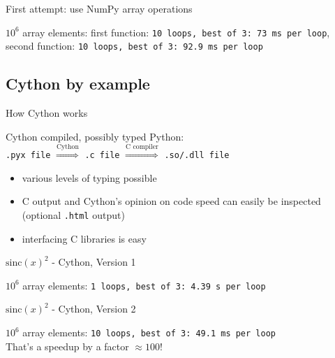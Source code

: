 \begin{frame}{First attempt: use NumPy array operations}



\pause
$10^{6}$ array elements: first function: {\texttt{10 loops, best of 3: 73 ms per loop}},
second function: {\texttt{10 loops, best of 3: 92.9 ms per loop}}

\end{frame}


\subsection{Cython by example}

\begin{frame}{How Cython works}

\begin{exbox}{Cython}
compiled, possibly typed Python:\\[1ex]
{\texttt{.pyx file}} $\stackrel{\text{Cython}}{\Longrightarrow}$ {\texttt{.c file}} $\stackrel{\text{C compiler}}{\Longrightarrow}$ {\texttt{.so/.dll file}}
\end{exbox}

\begin{itemize}
    \item various levels of typing possible
    \item C output and Cython's opinion on code speed can easily be
    inspected (optional {\texttt{.html}} output)
    \item interfacing C libraries is easy
\end{itemize}

\end{frame}


\begin{frame}[fragile]{$\mathrm{sinc}(x)^{2}$ - Cython, Version 1}



\pause
$10^{6}$ array elements: {\texttt{1 loops, best of 3: 4.39 s per loop}}
\end{frame}


\begin{frame}[fragile]{$\mathrm{sinc}(x)^{2}$ - Cython, Version 2}



\pause
$10^{6}$ array elements: {\texttt{10 loops, best of 3: 49.1 ms per loop}}\\[0.5ex]
That's a \alert{speedup by a factor $\approx 100$}!
\end{frame}

